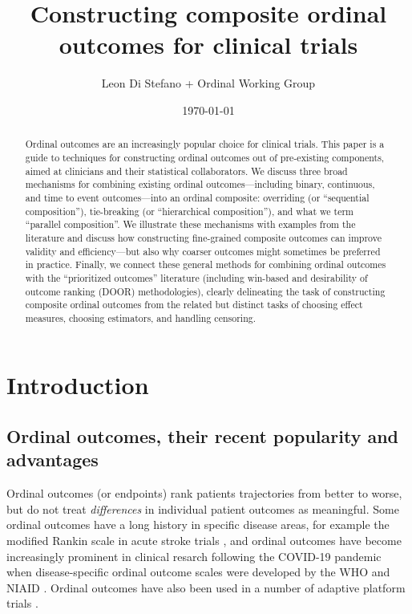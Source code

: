 \documentclass[
  11pt,
  fleqn
]{article}
\title{Constructing composite ordinal outcomes for clinical trials}
\author{Leon Di Stefano + Ordinal
Working Group}
\date{\today}
\begin{document}
\maketitle

\begin{abstract}


  Ordinal outcomes are an increasingly popular choice for clinical trials. This
  paper is a guide to techniques for constructing ordinal outcomes out of
  pre-existing components, aimed at clinicians and their statistical
  collaborators. We discuss three broad mechanisms for combining existing
  ordinal outcomes---including binary, continuous, and time to event
  outcomes---into an ordinal composite: overriding (or ``sequential
  composition''), tie-breaking (or ``hierarchical composition''), and what we
  term ``parallel composition''. We illustrate these mechanisms with examples
  from the literature and discuss how constructing fine-grained composite
  outcomes can improve validity and efficiency---but also why coarser outcomes
  might sometimes be preferred in practice. Finally, we connect these general
  methods for combining ordinal outcomes with the ``prioritized outcomes''
  literature (including win-based and desirability of outcome ranking (DOOR)
  methodologies), clearly delineating the task of constructing composite
  ordinal outcomes from the related but distinct tasks of choosing effect
  measures, choosing estimators, and handling censoring.

\end{abstract}
\newpage
\tableofcontents
\newpage

\section{Introduction}

\subsection{Ordinal outcomes, their recent popularity and advantages}

Ordinal outcomes (or endpoints) rank patients trajectories from better to
worse, but do not treat \emph{differences} in individual patient outcomes as
meaningful. Some ordinal outcomes have a long history in specific disease
areas, for example the modified Rankin scale in acute stroke trials
\citep{broderickEvolutionModifiedRankin2017}, and ordinal outcomes have become
increasingly prominent in clinical resarch following the COVID-19 pandemic when
disease-specific ordinal outcome scales were developed by the WHO and NIAID
\citep{beigelRemdesivirTreatmentCovid192020, marshallMinimalCommonOutcome2020}.
Ordinal outcomes have also been used in a number of adaptive platform trials
\citep{angusREMAPCAPRandomizedEmbedded2020, walkerCodesigningNovelOrdinal2025}.
\end{document}
